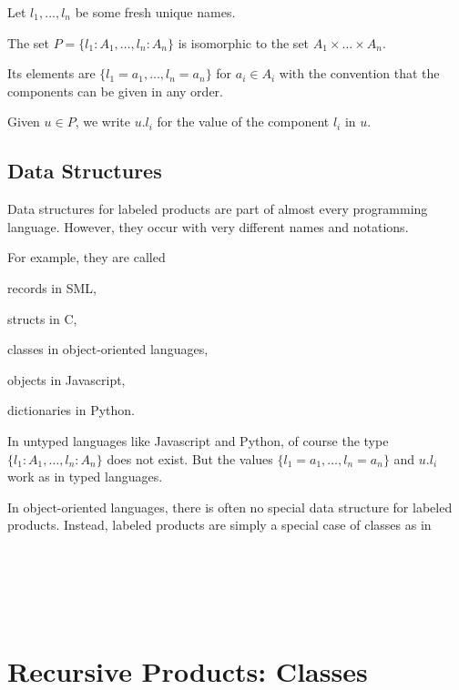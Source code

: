 Let $l_1,\ldots,l_n$ be some fresh unique names.

The set $P=\{l_1:A_1,\ldots,l_n:A_n\}$ is isomorphic to the set $A_1\times \ldots\times A_n$.

Its elements are $\{l_1=a_1,\ldots,l_n=a_n\}$ for $a_i\in A_i$ with the convention that the components can be given in any order.

Given $u\in P$, we write $u.{l_i}$ for the value of the component $l_i$ in $u$.

\subsection{Data Structures}

Data structures for labeled products are part of almost every programming language.
However, they occur with very different names and notations.

For example, they are called
\begin{compactitem}
 \item records in SML,
 \item structs in C,
 \item classes in object-oriented languages,
 \item objects in Javascript,
 \item dictionaries in Python.
\end{compactitem}

In untyped languages like Javascript and Python, of course the type $\{l_1:A_1,\ldots,l_n:A_n\}$ does not exist.
But the values $\{l_1=a_1,\ldots,l_n=a_n\}$ and $u.{l_i}$ work as in typed languages.

In object-oriented languages, there is often no special data structure for labeled products.
Instead, labeled products are simply a special case of classes as in
\begin{acode}
\\
\\
\\
\tb{}\\
\end{acode}


\section{Recursive Products: Classes}

